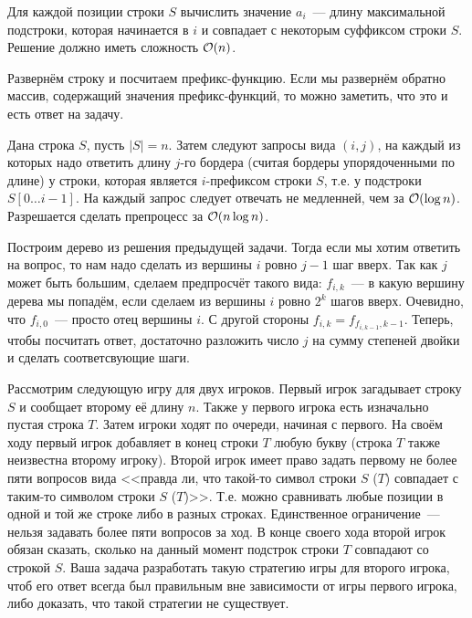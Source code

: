 \documentclass[addpoints]{exam}
\begin{document}
\begin{questions}
\question[\half] Для каждой позиции строки $S$ вычислить значение $a_i$~--- длину максимальной подстроки, которая начинается в $i$ и совпадает с некоторым суффиксом строки $S$. Решение должно иметь сложность $\mathcal{O}(n)$.

\begin{solution}

Развернём строку и посчитаем префикс-функцию. Если мы развернём обратно массив, содержащий значения префикс-функций, то можно заметить, что это и есть ответ на задачу.

\end{solution}

\question[1] Дана строка $S$, пусть $|S| = n$. Затем следуют запросы вида $(i,j)$, на каждый из которых надо ответить длину $j$-го бордера (считая бордеры упорядоченными по длине) у строки, которая является $i$-префиксом строки $S$, т.е. у подстроки $S[0 \ldots i-1]$. На каждый запрос следует отвечать не медленней, чем за $\mathcal{O}(\log{n})$. Разрешается сделать препроцесс за $\mathcal{O}(n \log n)$.

\begin{solution}

Построим дерево из решения предыдущей задачи. Тогда если мы хотим ответить на вопрос, то нам надо сделать из вершины $i$ ровно $j-1$ шаг вверх. Так как $j$ может быть большим, сделаем предпросчёт такого вида: $f_{i,k}$~--- в какую вершину дерева мы попадём, если сделаем из вершины $i$ ровно $2^k$ шагов вверх. Очевидно, что $f_{i,0}$~--- просто отец вершины $i$. С другой стороны $f_{i,k} = f_{f_{i,k-1},k-1}$. Теперь, чтобы посчитать ответ, достаточно разложить число $j$ на сумму степеней двойки и сделать соответсвующие шаги.

\end{solution}

\question[1] Рассмотрим следующую игру для двух игроков. Первый игрок загадывает строку $S$ и сообщает второму её длину $n$. Также у первого игрока есть изначально пустая строка $T$. Затем игроки ходят по очереди, начиная с первого. На своём ходу первый игрок добавляет в конец строки $T$ любую букву (строка $T$ также неизвестна второму игроку). Второй игрок имеет право задать первому не более пяти вопросов вида <<правда ли, что такой-то символ строки $S$ ($T$) совпадает с таким-то символом строки $S$ ($T$)>>. Т.е. можно сравнивать любые позиции в одной и той же строке либо в разных строках. Единственное ограничение~--- нельзя задавать более пяти вопросов за ход. В конце своего хода второй игрок обязан сказать, сколько на данный момент подстрок строки $T$ совпадают со строкой $S$. Ваша задача разработать такую стратегию игры для второго игрока, чтоб его ответ всегда был правильным вне зависимости от игры первого игрока, либо доказать, что такой стратегии не существует.


\end{questions}
\end{document}
